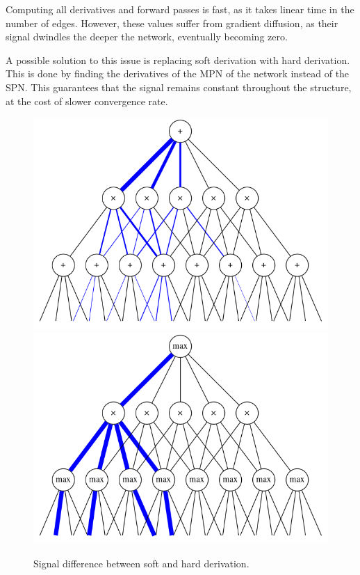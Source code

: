 Computing all derivatives and forward passes is fast, as it takes linear time in the number of
edges. However, these values suffer from gradient diffusion, as their signal dwindles the deeper
the network, eventually becoming zero.

A possible solution to this issue is replacing soft derivation with hard derivation. This is done
by finding the derivatives of the MPN of the network instead of the SPN\@. This guarantees that the
signal remains constant throughout the structure, at the cost of slower convergence rate.

\begin{figure}[h]
  \centering\includegraphics[scale=0.325]{graphs/softgrad.png}
  \includegraphics[scale=0.325]{graphs/hardgrad.png}
  \caption{Signal difference between soft and hard derivation.\label{fig:soft_hard_diff}}
\end{figure}

